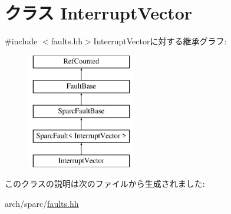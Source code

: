 \hypertarget{classSparcISA_1_1InterruptVector}{
\section{クラス InterruptVector}
\label{classSparcISA_1_1InterruptVector}
}


{\ttfamily \#include $<$faults.hh$>$}InterruptVectorに対する継承グラフ:\begin{figure}[H]
\begin{center}
\leavevmode
\includegraphics[height=5cm]{classSparcISA_1_1InterruptVector}
\end{center}
\end{figure}


このクラスの説明は次のファイルから生成されました:\begin{DoxyCompactItemize}
\item 
arch/sparc/\hyperlink{arch_2sparc_2faults_8hh}{faults.hh}\end{DoxyCompactItemize}
